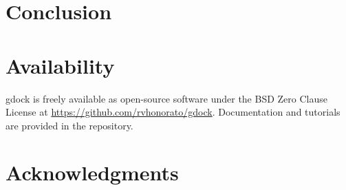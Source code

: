 \documentclass[11pt,a4paper]{article}
\begin{document}
\section{Conclusion}


\section{Availability}

gdock is freely available as open-source software under the BSD Zero Clause License at
\url{https://github.com/rvhonorato/gdock}. Documentation and tutorials are provided
in the repository.

\section*{Acknowledgments}




\end{document}
